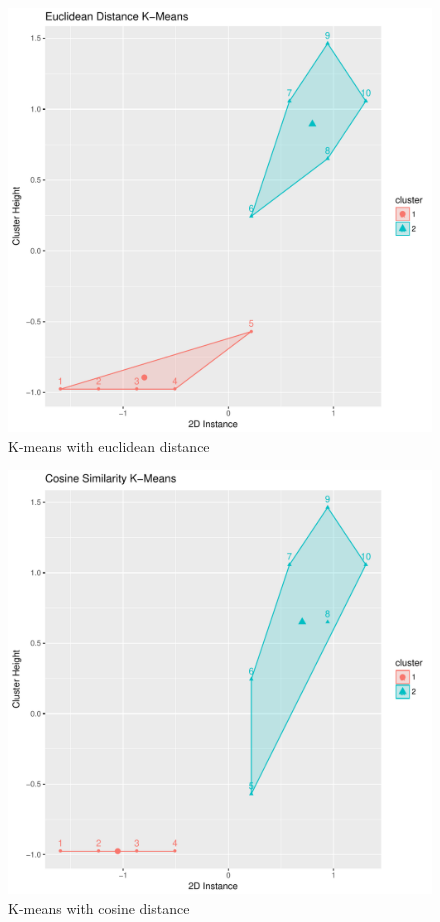 \documentclass[letterpaper,11pt]{article}
\begin{document}
\begin{figure}[h]
\centering
\includegraphics[scale=0.5]{kmeans-euc.pdf}
\caption{K-means with euclidean distance}
\label{fig:kmeans-euc}
\end{figure}

\begin{figure}[h]
\centering
\includegraphics[scale=0.5]{kmeans-cos.pdf}
\caption{K-means with cosine distance}
\label{fig:kmeans-cos}
\end{figure}
\end{document}
